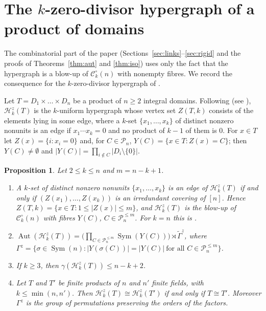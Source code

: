 \documentclass{amsart}
\newtheorem{proposition}[theorem]{Proposition}
\theoremstyle{definition}
\theoremstyle{remark}
\newcommand{\Aut}{\operatorname{Aut}}
\newcommand{\Sym}{\operatorname{Sym}}
\newcommand{\cC}{\mathcal{C}}
\newcommand{\cP}{\mathcal{P}}
\newcommand{\cH}{\mathcal{H}}
\newcommand{\nn}{[n]}
\begin{document}
\section{The \texorpdfstring{$k$}{k}-zero-divisor hypergraph of a product of domains}\label{sec:zd}

The combinatorial part of the paper (Sections~\ref{sec:links}--\ref{sec:rigid} and the proofs of Theorems~\ref{thm:aut} and \ref{thm:iso}) uses only the fact that the hypergraph is a blow-up of $\cC_k^\circ(n)$ with nonempty fibres. We record the consequence for the $k$-zero-divisor hypergraph of \cite{ER07}.

Let $T=D_1\times\dots\times D_n$ be a product of $n\ge2$ integral domains. Following \cite{ER07} (see \cite[Definitions~1.1, 1.2]{MNR23}), $\cH^z_k(T)$ is the $k$-uniform hypergraph whose vertex set $Z(T,k)$ consists of the elements lying in some edge, where a $k$-set $\{x_1,\dots,x_k\}$ of distinct nonzero nonunits is an edge if $x_1\cdots x_k=0$ and no product of $k-1$ of them is $0$. For $x\in T$ let $Z(x)=\{i: x_i=0\}$ and, for $C\in\cP_n$, $Y(C)=\{x\in T: Z(x)=C\}$; then $Y(C)\ne\emptyset$ and $|Y(C)|=\prod_{i\notin C}|D_i\setminus\{0\}|$.

\begin{proposition}\label{prop:zd}
Let $2\le k\le n$ and $m=n-k+1$.
\begin{enumerate}
\item[(a)] A $k$-set of distinct nonzero nonunits $\{x_1,\dots,x_k\}$ is an edge of $\cH^z_k(T)$ if and only if $(Z(x_1),\dots,Z(x_k))$ is an irredundant covering of $\nn$. Hence $Z(T,k)=\{x\in T: 1\le|Z(x)|\le m\}$, and $\cH^z_k(T)$ is the blow-up of $\cC_k^\circ(n)$ with fibres $Y(C)$, $C\in\cP_n^{\le m}$. For $k=n$ this is \cite[Lemma~2.1]{MNR23}.
\item[(b)] $\Aut(\cH^z_k(T))=\bigl(\prod_{C\in\cP_n^{\le m}}\Sym(Y(C))\bigr)\rtimes\tilde\Gamma^z$, where $\Gamma^z=\{\sigma\in\Sym(n): |Y(\sigma(C))|=|Y(C)|\ \text{for all } C\in\cP_n^{\le m}\}$.
\item[(c)] If $k\ge3$, then $\gamma(\cH^z_k(T))\le n-k+2$.
\item[(d)] Let $T$ and $T'$ be finite products of $n$ and $n'$ finite fields, with $k\le\min(n,n')$. Then $\cH^z_k(T)\cong\cH^z_k(T')$ if and only if $T\cong T'$. Moreover $\Gamma^z$ is the group of permutations preserving the orders of the factors.
\end{enumerate}
\end{proposition}
\end{document}
